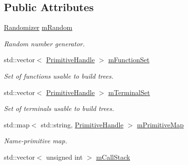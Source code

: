 \subsection*{Public Attributes}
\begin{DoxyCompactItemize}
\item 
\hypertarget{classPuppy_1_1Context_af2256bb8abbf0ba324dfff53a4595dca}{}\hyperlink{classPuppy_1_1Randomizer}{Randomizer} \hyperlink{classPuppy_1_1Context_af2256bb8abbf0ba324dfff53a4595dca}{m\+Random}\label{classPuppy_1_1Context_af2256bb8abbf0ba324dfff53a4595dca}

\begin{DoxyCompactList}\small\item\em Random number generator. \end{DoxyCompactList}\item 
\hypertarget{classPuppy_1_1Context_a3bdbacd226f2ee69b613fc1537c4da92}{}std\+::vector$<$ \hyperlink{classPuppy_1_1PrimitiveHandle}{Primitive\+Handle} $>$ \hyperlink{classPuppy_1_1Context_a3bdbacd226f2ee69b613fc1537c4da92}{m\+Function\+Set}\label{classPuppy_1_1Context_a3bdbacd226f2ee69b613fc1537c4da92}

\begin{DoxyCompactList}\small\item\em Set of functions usable to build trees. \end{DoxyCompactList}\item 
\hypertarget{classPuppy_1_1Context_abd8b7bfb706eb01ccc4e46e78a41385a}{}std\+::vector$<$ \hyperlink{classPuppy_1_1PrimitiveHandle}{Primitive\+Handle} $>$ \hyperlink{classPuppy_1_1Context_abd8b7bfb706eb01ccc4e46e78a41385a}{m\+Terminal\+Set}\label{classPuppy_1_1Context_abd8b7bfb706eb01ccc4e46e78a41385a}

\begin{DoxyCompactList}\small\item\em Set of terminals usable to build trees. \end{DoxyCompactList}\item 
\hypertarget{classPuppy_1_1Context_ac5f0006c4d7f3362ee83d0330c50fa70}{}std\+::map$<$ std\+::string, \hyperlink{classPuppy_1_1PrimitiveHandle}{Primitive\+Handle} $>$ \hyperlink{classPuppy_1_1Context_ac5f0006c4d7f3362ee83d0330c50fa70}{m\+Primitive\+Map}\label{classPuppy_1_1Context_ac5f0006c4d7f3362ee83d0330c50fa70}

\begin{DoxyCompactList}\small\item\em Name-\/primitive map. \end{DoxyCompactList}\item 
\hypertarget{classPuppy_1_1Context_ac26d2fb60125a52a9443c2de815690b2}{}std\+::vector$<$ unsigned int $>$ \hyperlink{classPuppy_1_1Context_ac26d2fb60125a52a9443c2de815690b2}{m\+Call\+Stack}\label{classPuppy_1_1Context_ac26d2fb60125a52a9443c2de815690b2}


\end{DoxyCompactItemize}
